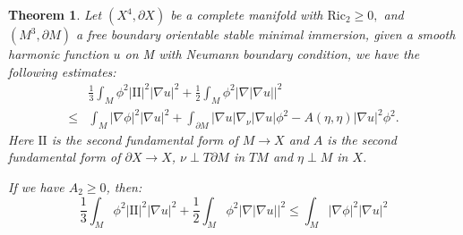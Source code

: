 \documentclass[12pt]{amsart}
\newcommand{\sff}{\mathrm{I\!I}}
\newcommand{\Ric}{\text{Ric}}
\newtheorem{theorem}{Theorem}[section]
\numberwithin{equation}{section}
\begin{document}
	\begin{theorem} \label{stableineq1}
		Let $(X^4,\partial X)$ be a complete manifold with $\Ric_2 \geq 0,$ and $(M^3,\partial M)$ a free boundary orientable stable minimal immersion, given a smooth harmonic function $u$ on M with Neumann boundary condition, we have the following estimates:
		\begin{align*}
			&\frac{1}{3}\int_M \phi^2 |\sff|^2 |\nabla u|^2 + \frac{1}{2}\int_M \phi^2 |\nabla |\nabla u||^2 \\
			\leq & \int_M |\nabla \phi|^2 |\nabla u|^2
			+ \int_{\partial M} |\nabla u| \nabla_{\nu} |\nabla u| \phi^2 - A(\eta,\eta)|\nabla u|^2\phi^2.
		\end{align*}
		Here $\sff$ is the second fundamental form of $M \rightarrow X$ and $A$ is the second fundamental form of $\partial X \rightarrow X$, $\nu \perp T\partial M$ in $TM$ and $\eta \perp M$ in $X$.

		If we have $A_2 \geq 0$, then:
		\begin{equation} \label{stabineq2}
			\frac{1}{3}\int_M \phi^2 |\sff|^2 |\nabla u|^2 + \frac{1}{2}\int_M \phi^2 |\nabla |\nabla u||^2 \leq \int_M |\nabla \phi|^2 |\nabla u|^2
		\end{equation}
	\end{theorem}
\end{document}
